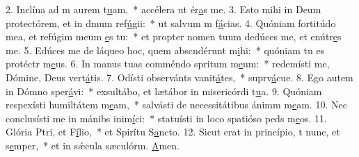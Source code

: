 2. Inclína ad m aurem t\uline{u}am,~* accélera ut ér\uline{a}s me.
3. Esto mihi in Deum protectórem, et in dmum ref\uline{ú}gii:~* ut salvum m f\uline{á}cias.
4. Quóniam fortitúdo mea, et refúgim meum \uline{e}s tu:~* et propter nomen tuum dedúces me, et enútr\uline{e}s me.
5. Edúces me de láqueo hoc, quem abscndérunt m\uline{i}hi:~* quóniam tu es protéctr m\uline{e}us.
6. In manus tuas comméndo spritum m\uline{e}um:~* redemísti me, Dómine, Deus vert\uline{á}tis.
7. Odísti observánts vanit\uline{á}tes,~* suprv\uline{á}cue.
8. Ego autem in Dómno sper\uline{á}vi:~* exsultábo, et lætábor in misericórdi t\uline{u}a.
9. Quóniam respexísti humiltátem m\uline{e}am,~* salvásti de necessitátibus ánimm m\uline{e}am.
10. Nec conclusísti me in mánibs inim\uline{í}ci:~* statuísti in loco spatióso peds m\uline{e}os.
11. Glória Ptri, et F\uline{í}lio,~* et Spirítu S\uline{a}ncto.
12. Sicut erat in princípio, t nunc, et s\uline{e}mper,~* et in sǽcula sæculórm. \uline{A}men.
